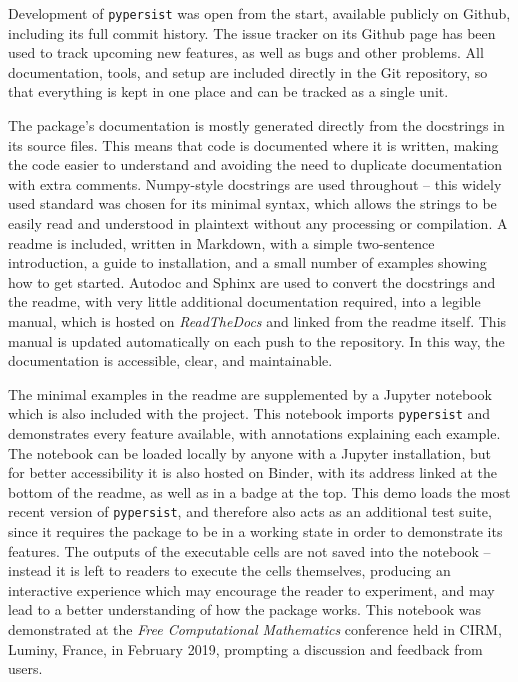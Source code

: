 \documentclass{deliverablereport}
\newcommand{\pypersist}{\texttt{pypersist}}
\begin{document}
Development of \pypersist{} was open from the start, available publicly on
Github, including its full commit history.  The issue tracker on its Github page
has been used to track upcoming new features, as well as bugs and other
problems.  All documentation, tools, and setup are included directly in the Git
repository, so that everything is kept in one place and can be tracked as a
single unit.

The package's documentation is mostly generated directly from the docstrings in
its source files.  This means that code is documented where it is written,
making the code easier to understand and avoiding the need to duplicate
documentation with extra comments.  Numpy-style docstrings are used throughout
-- this widely used standard was chosen for its minimal syntax, which allows the
strings to be easily read and understood in plaintext without any processing or
compilation.  A readme is included, written in Markdown, with a simple
two-sentence introduction, a guide to installation, and a small number of examples
showing how to get started.  Autodoc and Sphinx are used to convert the
docstrings and the readme, with very little additional documentation required,
into a legible manual, which is hosted on \textit{ReadTheDocs} and linked from
the readme itself.  This manual is updated automatically on each push to the
repository.  In this way, the documentation is accessible, clear, and
maintainable.

The minimal examples in the readme are supplemented by a Jupyter notebook which
is also included with the project.  This notebook imports \pypersist{} and
demonstrates every feature available, with annotations explaining each example.
The notebook can be loaded locally by anyone with a Jupyter installation, but
for better accessibility it is also hosted on Binder, with its address linked at
the bottom of the readme, as well as in a badge at the top.  This demo loads the
most recent version of \pypersist{}, and therefore also acts as an additional
test suite, since it requires the package to be in a working state in order to
demonstrate its features.  The outputs of the executable cells are not saved
into the notebook -- instead it is left to readers to execute the cells
themselves, producing an interactive experience which may encourage the reader to
experiment, and may lead to a better understanding of how the package works.
This notebook was demonstrated at the \emph{Free Computational Mathematics}
conference held in CIRM, Luminy, France, in February 2019, prompting a
discussion and feedback from users.
\end{document}
